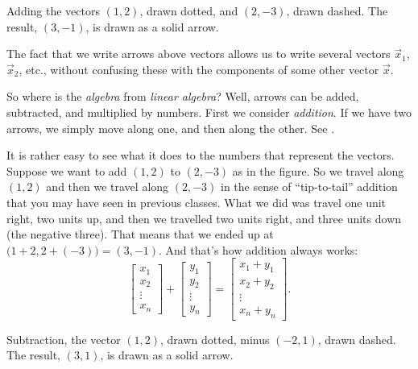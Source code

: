 \begin{mywrapfig}[15]{3.25in}
\capstart
{}
\caption{Adding the vectors $(1,2)$, drawn dotted, and $(2,-3)$, drawn dashed.  The
result, $(3,-1)$, is drawn as a solid arrow.\label{linalg-vecadd:fig}}
\end{mywrapfig}

The fact that we write arrows above vectors allows us to write several
vectors $\vec{x}_1$, $\vec{x}_2$, etc., without confusing these with the
components of some other vector $\vec{x}$.

So where is the \emph{algebra} from \emph{linear algebra}?
Well, arrows can be added, subtracted,
and multiplied by numbers.
First we consider \emph{addition}.
If we have two arrows, we simply
move along one, and then along the other.  See
.

It is rather easy to see what it does to the numbers that represent the
vectors.  Suppose we want to add $(1,2)$ to $(2,-3)$ as in the figure.
So we travel along $(1,2)$
and then we travel along $(2,-3)$ in the sense of ``tip-to-tail'' addition that you may have seen in previous classes.
What we did was travel one unit right, two units up, and then
we travelled two units right, and three units down (the negative three).  That
means that we ended up at $\bigl(1+2,2+(-3)\bigr) = (3,-1)$.
And that's how addition always works:
\begin{equation*}
\begin{bmatrix}
x_{1} \\ x_2 \\ \vdots \\ x_n
\end{bmatrix} +
\begin{bmatrix}
y_{1} \\ y_2 \\ \vdots \\ y_n
\end{bmatrix} =
\begin{bmatrix}
x_1 + y_{1} \\ x_2+ y_2 \\ \vdots \\ x_n + y_n
\end{bmatrix} .
\end{equation*}

\begin{mywrapfig}[13]{3.25in}
\capstart
{}
\caption{Subtraction, the vector $(1,2)$, drawn dotted, minus $(-2,1)$,
drawn dashed.  The
result, $(3,1)$, is drawn as a solid arrow.\label{linalg-vecsub:fig}}
\end{mywrapfig}

